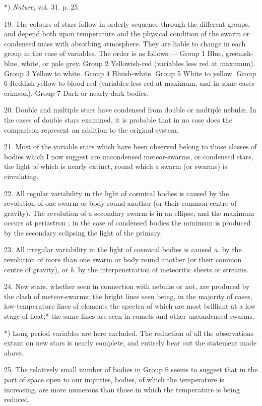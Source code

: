 \documentclass[a4paper, 12pt, oneside, polutonikogreek, english]{article}
\begin{document}
*) \emph{Nature}, vol. 31. p. 25.

19. The colours of stars follow in orderly sequence through the different groups, and depend both upon temperature and the physical condition of the swarm or condensed mass with absorbing atmosphere. They are liable to change in each group in the case of variables. The order is as follows:--- Group 1 Blue, greenish-blue, white, or pale grey. Group 2 Yellowish-red (variables less red at maximum). Group 3 Yellow to white. Group 4 Bluish-white. Group 5 White to yellow. Group 6 Reddish-yellow to blood-red (variables less red at maximum, and in some cases crimson). Group 7 Dark or nearly dark bodies.

20. Double and multiple stars have condensed from double or multiple nebulæ. In the cases of double stars examined, it is probable that in no case does the comparison represent an addition to the original system.

21. Most of the variable stars which have been observed belong to those classes of bodies which I now suggest are uncondensed meteor-swarms, or condensed stars, the light of which is nearly extinct, round which a swarm (or swarms) is circulating.

22. All regular variability in the light of cosmical bodies is caused by the revolution of one swarm or body round another (or their common centre of gravity). The revolution of a secondary swarm is in an ellipse, and the maximum occurs at periastron ; in the case of condensed bodies the minimum is produced by the secondary eclipsing the light of the primary.

23. All irregular variability in the light of cosmical bodies is caused \emph{a.} by the revolution of more than one swarm or body round another (or their common centre of gravity), or \emph{b.} by the interpenetration of meteoritic sheets or streams.

24. New stars, whether seen in connection with nebulæ or not, are produced by the clash of meteor-swarms; the bright lines seen being, in the majority of cases, low-temperature lines of elements the spectra of which are most brilliant at a low stage of heat;* the same lines are seen in comets and other uncondensed swarms.

*) Long period variables are here excluded. The reduction of all the observations extant on new stars is nearly complete, and entirely bear out the statement made above.

25. The relatively small number of bodies in Group 6 seems to suggest that in the part of space open to our inquiries, bodies, of which the temperature is increasing, are more numerous than those in which the temperature is being reduced.
\end{document}
